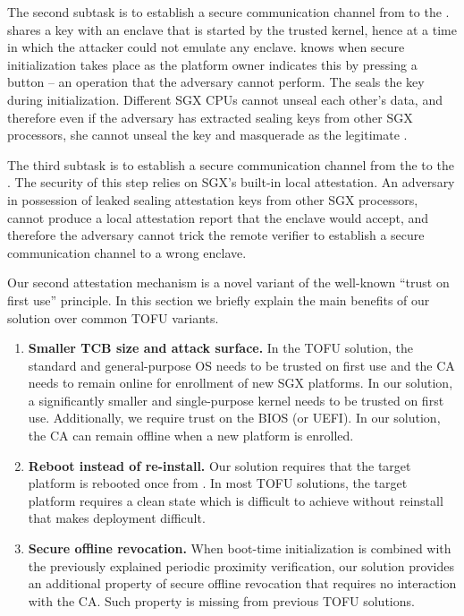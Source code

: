 The second subtask is to establish a secure communication channel from \device to the \nameclave. \device shares a key with an enclave that is started by the trusted \name kernel, hence at a time in which the attacker could not emulate any enclave. \device knows when secure initialization takes place as the platform owner indicates this by pressing a button -- an operation that the adversary cannot perform. The \nameclave seals the key during initialization. Different SGX CPUs cannot unseal each other's data, and therefore even if the adversary has extracted sealing keys from other SGX processors, she cannot unseal the key and masquerade as the legitimate \nameclave. 

The third subtask is to establish a secure communication channel from the \nameclave to the \app. The security of this step relies on SGX's built-in local attestation. An adversary in possession of leaked sealing attestation keys from other SGX processors, cannot produce a local attestation report that the \name enclave would accept, and therefore the adversary cannot trick the remote verifier to establish a secure communication channel to a wrong enclave.


 Our second attestation mechanism is a novel variant of the well-known ``trust on first use'' principle. In this section we briefly explain the main benefits of our solution over common TOFU variants. 

\begin{enumerate}
\item \textbf{Smaller TCB size and attack surface.} 
In the TOFU solution, the standard and general-purpose OS needs to be trusted on first use and the CA needs to remain online for enrollment of new SGX platforms. In our solution, a significantly smaller and single-purpose kernel needs to be trusted on first use. Additionally, we require trust on the BIOS (or UEFI). In our solution, the CA can remain offline when a new platform is enrolled.


\item \textbf{Reboot instead of re-install.} Our solution requires that the target platform is rebooted once from \device. In most TOFU solutions, the target platform requires a clean state which is difficult to achieve without reinstall that makes deployment difficult.


\item \textbf{Secure offline revocation.} When boot-time initialization is combined with the previously explained periodic proximity verification, our solution provides an additional property of secure offline revocation that requires no interaction with the CA. Such property is missing from previous TOFU solutions.

\end{enumerate}

